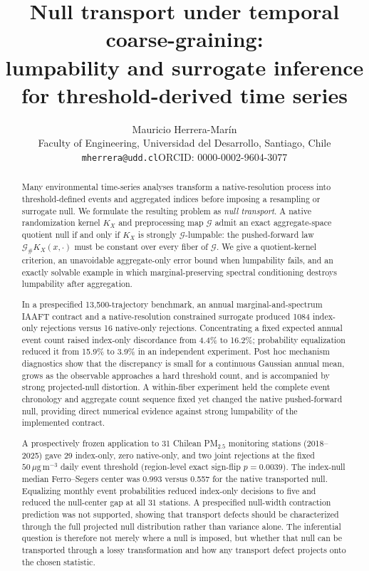 \documentclass[12pt]{article}
\title{Null transport under temporal coarse-graining:\\ lumpability and surrogate inference for threshold-derived time series}
\author{Mauricio Herrera-Mar\'in\\[2pt]
\small Faculty of Engineering, Universidad del Desarrollo, Santiago, Chile\\
\small \texttt{mherrera@udd.cl}\quad ORCID: 0000-0002-9604-3077}
\date{}
\theoremstyle{definition}
\theoremstyle{remark}
\begin{document}
\doublespacing
\linenumbers
\maketitle

\begin{abstract}
Many environmental time-series analyses transform a native-resolution process into threshold-defined events and aggregated indices before imposing a resampling or surrogate null. We formulate the resulting problem as \emph{null transport}. A native randomization kernel $K_X$ and preprocessing map $\mathcal G$ admit an exact aggregate-space quotient null if and only if $K_X$ is strongly $\mathcal G$-lumpable: the pushed-forward law $\mathcal G_\#K_X(x,\cdot)$ must be constant over every fiber of $\mathcal G$. We give a quotient-kernel criterion, an unavoidable aggregate-only error bound when lumpability fails, and an exactly solvable example in which marginal-preserving spectral conditioning destroys lumpability after aggregation.

In a prespecified 13,500-trajectory benchmark, an annual marginal-and-spectrum IAAFT contract and a native-resolution constrained surrogate produced 1084 index-only rejections versus 16 native-only rejections. Concentrating a fixed expected annual event count raised index-only discordance from 4.4\% to 16.2\%; probability equalization reduced it from 15.9\% to 3.9\% in an independent experiment. Post hoc mechanism diagnostics show that the discrepancy is small for a continuous Gaussian annual mean, grows as the observable approaches a hard threshold count, and is accompanied by strong projected-null distortion. A within-fiber experiment held the complete event chronology and aggregate count sequence fixed yet changed the native pushed-forward null, providing direct numerical evidence against strong lumpability of the implemented contract.

A prospectively frozen application to 31 Chilean PM$_{2.5}$ monitoring stations (2018--2025) gave 29 index-only, zero native-only, and two joint rejections at the fixed $50\,\mu\mathrm{g\,m^{-3}}$ daily event threshold (region-level exact sign-flip $p=0.0039$). The index-null median Ferro--Segers center was 0.993 versus 0.557 for the native transported null. Equalizing monthly event probabilities reduced index-only decisions to five and reduced the null-center gap at all 31 stations. A prespecified null-width contraction prediction was not supported, showing that transport defects should be characterized through the full projected null distribution rather than variance alone. The inferential question is therefore not merely where a null is imposed, but whether that null can be transported through a lossy transformation and how any transport defect projects onto the chosen statistic.
\end{abstract}
\end{document}
